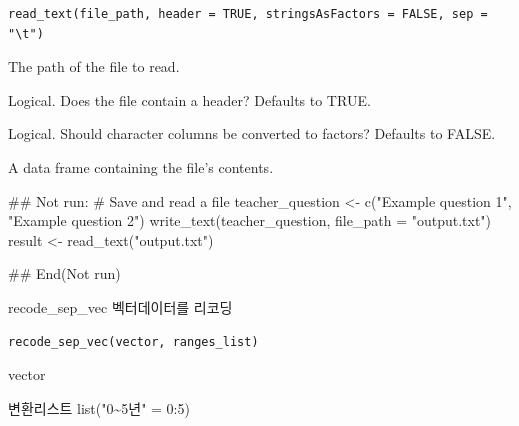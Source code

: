 \documentclass[a4paper]{book}
\begin{document}
%
\begin{Usage}
\begin{verbatim}
read_text(file_path, header = TRUE, stringsAsFactors = FALSE, sep = "\t")
\end{verbatim}
\end{Usage}
%
\begin{Arguments}
\begin{ldescription}
\item[\code{file\_path}] The path of the file to read.

\item[\code{header}] Logical. Does the file contain a header? Defaults to TRUE.

\item[\code{stringsAsFactors}] Logical. Should character columns be converted to factors? Defaults to FALSE.
\end{ldescription}
\end{Arguments}
%
\begin{Value}
A data frame containing the file's contents.
\end{Value}
%
\begin{Examples}
\begin{ExampleCode}
## Not run: 
# Save and read a file
teacher_question <- c("Example question 1", "Example question 2")
write_text(teacher_question, file_path = "output.txt")
result <- read_text("output.txt")

## End(Not run)

\end{ExampleCode}
\end{Examples}
%
\begin{Description}
recode\_sep\_vec 벡터데이터를 리코딩
\end{Description}
%
\begin{Usage}
\begin{verbatim}
recode_sep_vec(vector, ranges_list)
\end{verbatim}
\end{Usage}
%
\begin{Arguments}
\begin{ldescription}
\item[\code{vector}] vector

\item[\code{ranges\_list}] 변환리스트 list("0\textasciitilde{}5년" = 0:5)
\end{ldescription}
\end{Arguments}
\end{document}
